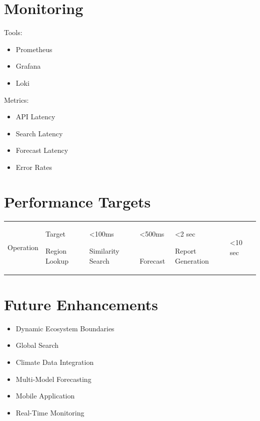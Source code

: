 \documentclass[11pt,a4paper]{article}
\begin{document}
\section{Monitoring}

Tools:

\begin{itemize}
\item Prometheus
\item Grafana
\item Loki
\end{itemize}

Metrics:

\begin{itemize}
\item API Latency
\item Search Latency
\item Forecast Latency
\item Error Rates
\end{itemize}

\section{Performance Targets}

\begin{tabular}{|p{5cm}|p{4cm}|}
\hline

Operation & Target \
\hline

Region Lookup & <100ms \
\hline

Similarity Search & <500ms \
\hline

Forecast & <2 sec \
\hline

Report Generation & <10 sec \
\hline

\end{tabular}

\section{Future Enhancements}

\begin{itemize}
\item Dynamic Ecosystem Boundaries
\item Global Search
\item Climate Data Integration
\item Multi-Model Forecasting
\item Mobile Application
\item Real-Time Monitoring
\end{itemize}
\end{document}
